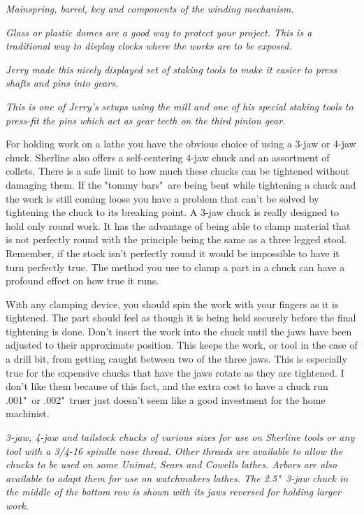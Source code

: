 \bigskip
\textit{Mainspring, barrel, key and components of the winding mechanism.}
\bigskip

\textit{Glass or plastic domes are a good way to protect your project. This is a
traditional way to display clocks where the works are to be exposed.}
\bigskip

\textit{Jerry made this nicely displayed set of staking tools to make it easier
to press shafts and pins into gears.}
\bigskip

\textit{This is one of Jerry's setups using the mill and one of his special
staking tools to press-fit the pins which act as gear teeth on the third pinion
gear.}
\bigskip

\secdown

\secdown

For holding work on a lathe you have the obvious choice of using a 3-jaw or
4-jaw chuck. Sherline also offers a self-centering 4-jaw chuck and an assortment
of collets. There is a safe limit to how much these chucks can be tightened
without damaging them. If the "tommy bars"\ are being bent while tightening a
chuck and the work is still coming loose you have a problem that can't be solved
by tightening the chuck to its breaking point. A 3-jaw chuck is really designed
to hold only round work. It has the advantage of being able to clamp material
that is not perfectly round with the principle being the same as a three legged
stool. Remember, if the stock isn't perfectly round it would be impossible to
have it turn perfectly true. The method you use to clamp a part in a chuck can
have a profound effect on how true it runs.


With any clamping device, you should spin the work with your fingers as it is
tightened. The part should feel as though it is being held securely before the
final tightening is done. Don't insert the work into the chuck until the jaws
have been adjusted to their approximate position. This keeps the work, or tool
in the case of a drill bit, from getting caught between two of the three jaws.
This is especially true for the expensive chucks that have the jaws rotate as
they are tightened. I don't like them because of this fact, and the extra cost
to have a chuck run .001"\ or .002"\ truer just doesn't seem like a good
investment for the home machinist.

\bigskip
\textit{3-jaw, 4-jaw and tailstock chucks of various sizes for use on Sherline
tools or any tool with a 3/4-16 spindle nose thread. Other threads are available
to allow the chucks to be used on some Unimat, Sears and Cowells lathes. Arbors
are also available to adapt them for use on watchmakers lathes. The 2.5"\ 3-jaw
chuck in the middle of the bottom row is shown with its jaws reversed for
holding larger work.}
\bigskip

\secup

\secup

\secup
